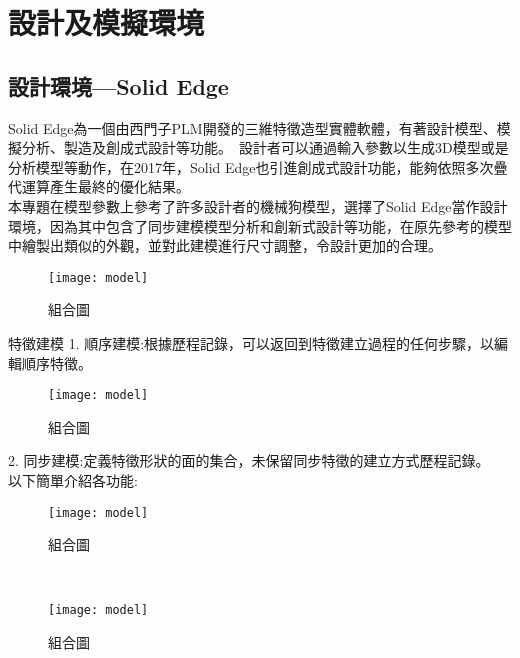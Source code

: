 \chapter{設計及模擬環境}

\section{設計環境---Solid Edge}
Solid Edge為一個由西門子PLM開發的三維特徵造型實體軟體，有著設計模型、模擬分析、製造及創成式設計等功能。\
設計者可以通過輸入參數以生成3D模型或是分析模型等動作，在2017年，Solid Edge也引進創成式設計功能，能夠依照多次疊代運算產生最終的優化結果。\\

本專題在模型參數上參考了許多設計者的機械狗模型，選擇了Solid Edge當作設計環境，因為其中包含了同步建模模型分析和創新式設計等功能，在原先參考的模型中繪製出類似的外觀，並對此建模進行尺寸調整，令設計更加的合理。\\

\begin{figure}[hbt!]
\center
\texttt{[image: model]}
\caption{\Large 組合圖}
\label{model}
\end{figure}

\qquad 特徵建模
1. 順序建模:根據歷程記錄，可以返回到特徵建立過程的任何步驟，以編輯順序特徵。\\

\begin{figure}[hbt!]
\center
\texttt{[image: model]}
\caption{\Large 組合圖}
\label{model}
\end{figure}

2. 同步建模:定義特徵形狀的面的集合，未保留同步特徵的建立方式歷程記錄。\\

以下簡單介紹各功能:\\

\begin{figure}[hbt!]
\center
\texttt{[image: model]}
\caption{\Large 組合圖}
\label{model}
\end{figure}\\

\begin{figure}[hbt!]
\center
\texttt{[image: model]}
\caption{\Large 組合圖}
\label{model}
\end{figure}

